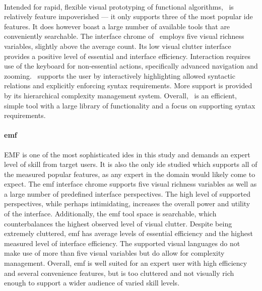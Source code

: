 \paragraph{\cameleon} Intended for rapid, flexible visual prototyping of
functional algorithms, \cameleon~is relatively feature impoverished --- it
only supports three of the most popular \ac{ide} features. It does however
boast a large number of available tools that are conveniently searchable.
The interface chrome of \cameleon~employs five visual richness variables,
slightly above the average count. Its low visual clutter interface provides
a positive level of essential and interface efficiency. Interaction
requires use of the keyboard for non-essential actions, specifically
advanced navigation and zooming. \cameleon~supports the user by
interactively highlighting allowed syntactic relations and explicitly
enforcing syntax requirements. More support is provided by its hierarchical
complexity management system. Overall, \cameleon~is an efficient, simple
tool with a large library of functionality and a focus on supporting syntax
requirements.

\paragraph{\acl{emf}} EMF is one of the most sophisticated \acp{ide} in
this study and demands an expert level of skill from target users. It is
also the only \ac{ide} studied which supports all of the measured popular
features, as any expert in the domain would likely come to expect. The
\ac{emf} interface chrome supports five visual richness variables as well
as a large number of predefined interface perspectives. The high level of
supported perspectives, while perhaps intimidating, increases the overall
power and utility of the interface. Additionally, the \ac{emf} tool space
is searchable, which counterbalances the highest observed level of visual
clutter. Despite being extremely cluttered, \ac{emf} has average levels of
essential efficiency and the highest measured level of interface
efficiency. The supported visual languages do not make use of more than
five visual variables but do allow for complexity management. Overall,
\ac{emf} is well suited for an expert user with high efficiency and several
convenience features, but is too cluttered and not visually rich enough to
support a wider audience of varied skill levels.

